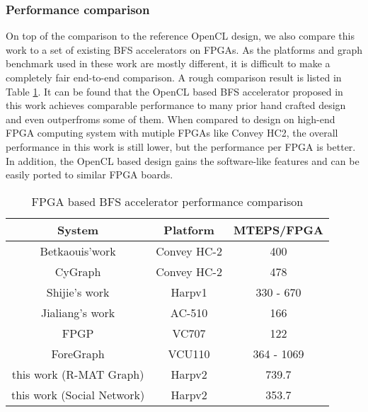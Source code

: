 \subsubsection{Performance comparison}
On top of the comparison to the reference OpenCL design, we also compare 
this work to a set of existing BFS accelerators on FPGAs. As the platforms 
and graph benchmark used in these work are mostly different, it is 
difficult to make a completely fair end-to-end comparison. 
A rough comparison result is listed in Table \ref{tab:compare}. It can be found that the OpenCL
based BFS accelerator proposed in this work achieves comparable performance to many 
prior hand crafted design and even outperfroms some of them. When compared to design on high-end 
FPGA computing system with mutiple FPGAs like Convey HC2\cite{attia2014cygraph}, 
the overall performance in this work is still lower, 
but the performance per FPGA is better. In addition, the OpenCL based design 
gains the software-like features and can be easily ported to similar FPGA boards.

\begin{table}
  \caption{FPGA based BFS accelerator performance comparison}
  \label{tab:compare}
    \setlength{\tabcolsep}{4pt} %
  \begin{tabular}{ccc}
    \toprule
	System & Platform & MTEPS/FPGA\\
    \midrule
	Betkaouis'work\cite{betkaoui2012reconfigurable} & Convey HC-2 & 400\\
	CyGraph\cite{attia2014cygraph} & Convey HC-2    & 478 \\
	Shijie's work \cite{zhou2017accelerating} & Harpv1 & 330 - 670 \\
	Jialiang's work\cite{zhang2017boosting} & AC-510 & 166 \\
	FPGP\cite{dai2016fpgp} & VC707 & 122 \\
	ForeGraph\cite{Dai2017foregraph} & VCU110 & 364 - 1069 \\
	this work (R-MAT Graph) & Harpv2 &  739.7\\
	this work (Social Network) & Harpv2 & 353.7 \\
  \bottomrule
\end{tabular}
\vspace{-1em}
\end{table}

